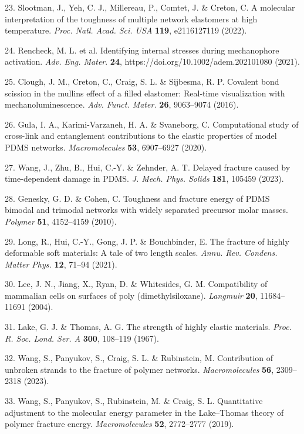 \documentclass{article}
\begin{document}
\begin{hangpars}
23. Slootman, J., Yeh, C. J., Millereau, P., Comtet, J. \& Creton, C. A molecular interpretation of the toughness of multiple network elastomers at high temperature. \emph{Proc. Natl. Acad. Sci. USA} \textbf{119}, e2116127119 (2022).

24. Rencheck, M. L. et al. Identifying internal stresses during mechanophore activation. \emph{Adv. Eng. Mater}. \textbf{24}, https://doi.org/10.1002/adem.202101080 (2021).

25. Clough, J. M., Creton, C., Craig, S. L. \& Sijbesma, R. P. Covalent bond scission in the mullins effect of a filled elastomer: Real‐time visualization with mechanoluminescence. \emph{Adv. Funct. Mater.} \textbf{26}, 9063–9074 (2016).

26. Gula, I. A., Karimi-Varzaneh, H. A. \& Svaneborg, C. Computational study of cross-link and entanglement contributions to the elastic properties of model PDMS networks. \emph{Macromolecules} \textbf{53}, 6907–6927 (2020).

27. Wang, J., Zhu, B., Hui, C.-Y. \& Zehnder, A. T. Delayed fracture caused by time-dependent damage in PDMS. \emph{J. Mech. Phys. Solids} \textbf{181}, 105459 (2023).

28. Genesky, G. D. \& Cohen, C. Toughness and fracture energy of PDMS bimodal and trimodal networks with widely separated precursor molar masses. \emph{Polymer} \textbf{51}, 4152–4159 (2010).

29. Long, R., Hui, C.-Y., Gong, J. P. \& Bouchbinder, E. The fracture of highly deformable soft materials: A tale of two length scales. \emph{Annu. Rev. Condens. Matter Phys.} \textbf{12}, 71–94 (2021).

30. Lee, J. N., Jiang, X., Ryan, D. \& Whitesides, G. M. Compatibility of mammalian cells on surfaces of poly (dimethylsiloxane). \emph{Langmuir} \textbf{20}, 11684–11691 (2004).

31. Lake, G. J. \& Thomas, A. G. The strength of highly elastic materials. \emph{Proc. R. Soc. Lond. Ser. A} \textbf{300}, 108–119 (1967).

32. Wang, S., Panyukov, S., Craig, S. L. \& Rubinstein, M. Contribution of unbroken strands to the fracture of polymer networks. \emph{Macromolecules} \textbf{56}, 2309–2318 (2023).

33. Wang, S., Panyukov, S., Rubinstein, M. \& Craig, S. L. Quantitative adjustment to the molecular energy parameter in the Lake–Thomas theory of polymer fracture energy. \emph{Macromolecules} \textbf{52}, 2772–2777 (2019).


\end{hangpars}
\end{document}
